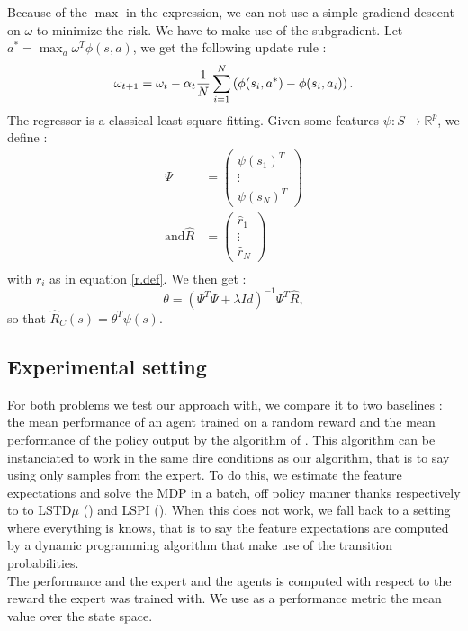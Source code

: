 \documentclass{llncs}
\newcommand{\0}{\mathbf{0}}
\newcommand{\1}{\mathbf{1}}
\begin{document}
Because of the $\max$ in the expression, we can not use a simple gradiend descent on $\omega$ to minimize the risk. We have to make use of the subgradient. Let $a^* = \max_a\omega^T\phi(s,a)$, we get the following update rule :
\begin{equation}
  \omega_{t+1} = \omega_t -\alpha_t{1\over N}\sum_{i=1}^N\left(\phi(s_i,a^*) - \phi(s_i,a_i)\right).
\end{equation}
The regressor is a classical least square fitting. Given some features $\psi : S\rightarrow \mathbb{R}^p$, we define :
\begin{eqnarray}
\Psi &= \begin{pmatrix}\psi(s_1)^T\\\vdots\\\psi(s_N)^T\end{pmatrix}\\
\textrm{and}
\hat R &= \begin{pmatrix}\hat r_1 \\\vdots\\\hat r_N\end{pmatrix}\\
\end{eqnarray}
with $r_i$ as in equation \ref{r.def}. We then get :
\begin{equation}
\theta = (\Psi^T\Psi + \lambda Id)^{-1}\Psi^T\hat R,
\end{equation}
so that $\hat R_C(s) = \theta^T \psi(s)$.\\
\subsection{Experimental setting}
For both problems we test our approach with, we compare it to two baselines : the mean performance of an agent trained on a random reward and the mean performance of the policy output by the algorithm of \cite{abbeel2004apprenticeship}. This algorithm can be instanciated to work in the same dire conditions as our algorithm, that is to say using only samples from the expert. To do this, we estimate the feature expectations and solve the MDP in a batch, off policy manner thanks respectively to to LSTD$\mu$ (\cite{klein2011batch}) and LSPI (\cite{lagoudakis2003least}). When this does not work, we fall back to a setting where everything is knows, that is to say the feature expectations are computed by a dynamic programming algorithm that make use of the transition probabilities.\\
The performance and the expert and the agents is computed with respect to the reward the expert was trained with. We use as a performance metric the mean value over the state space.
\end{document}
